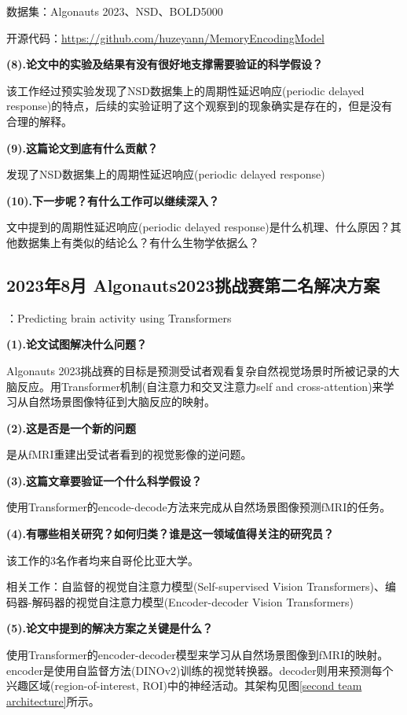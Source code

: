 \documentclass[12pt, a4paper, oneside]{ctexart}
\begin{document}
    数据集：Algonauts 2023、NSD、BOLD5000

    开源代码：\url{https://github.com/huzeyann/MemoryEncodingModel}

    \noindent\textbf{(8).论文中的实验及结果有没有很好地支撑需要验证的科学假设？}

    该工作经过预实验发现了NSD数据集上的周期性延迟响应(periodic delayed response)的特点，后续的实验证明了这个观察到的现象确实是存在的，但是没有合理的解释。

    \noindent\textbf{(9).这篇论文到底有什么贡献？}

    发现了NSD数据集上的周期性延迟响应(periodic delayed response)

    \noindent\textbf{(10).下一步呢？有什么工作可以继续深入？}

    文中提到的周期性延迟响应(periodic delayed response)是什么机理、什么原因？其他数据集上有类似的结论么？有什么生物学依据么？


    \subsection{2023年8月 Algonauts2023挑战赛第二名解决方案\cite{Adeli2023.08.02.551743}}
    ：Predicting brain activity using Transformers

    \noindent\textbf{(1).论文试图解决什么问题？}

    Algonauts 2023挑战赛的目标是预测受试者观看复杂自然视觉场景时所被记录的大脑反应。用Transformer机制(自注意力和交叉注意力self and cross-attention)来学习从自然场景图像特征到大脑反应的映射。

    \noindent\textbf{(2).这是否是一个新的问题}

    是从fMRI重建出受试者看到的视觉影像的逆问题。

    \noindent\textbf{(3).这篇文章要验证一个什么科学假设？}

    使用Transformer的encode-decode方法来完成从自然场景图像预测fMRI的任务。

    \noindent\textbf{(4).有哪些相关研究？如何归类？谁是这一领域值得关注的研究员？}

    该工作的3名作者均来自哥伦比亚大学。

    相关工作：自监督的视觉自注意力模型(Self-supervised Vision Transformers)、编码器-解码器的视觉自注意力模型(Encoder-decoder Vision Transformers)

    \noindent\textbf{(5).论文中提到的解决方案之关键是什么？}

    使用Transformer的encoder-decoder模型来学习从自然场景图像到fMRI的映射。encoder是使用自监督方法(DINOv2)训练的视觉转换器。decoder则用来预测每个兴趣区域(region-of-interest, ROI)中的神经活动。其架构见图\ref{second team architecture}所示。
\end{document}
